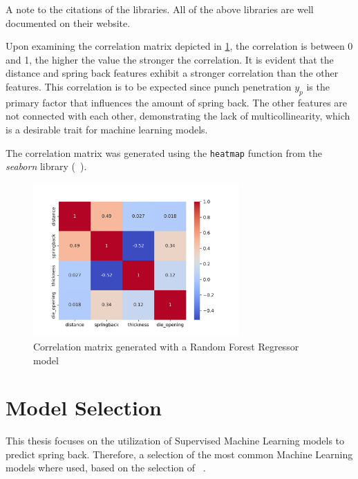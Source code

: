 A note to the citations of the libraries.
All of the above libraries are well documented on their website.

Upon examining the correlation matrix depicted in \cref{fig:correlation_matrix}, the correlation is between 0 and 1,
the higher the value the stronger the correlation.
It is evident that the distance and spring back features exhibit a stronger correlation
than the other features.
This correlation is to be expected since punch penetration $y_p$ is the primary factor
that influences the amount of spring back.
The other features are not connected with each other, demonstrating the lack of multicollinearity, which is a
desirable trait for machine learning models.

The correlation matrix was generated using the \texttt{heatmap} function from the \textit{seaborn} library
(~\cite{Waskom2021}).

\begin{figure}[H]
    \begin{tcolorbox}[arc=0pt,boxrule=0.5pt]
        \centering
        \includegraphics[width=0.7\textwidth]{chap4/images/correlation_matrix}
    \end{tcolorbox}
    \caption{Correlation matrix generated with a Random Forest Regressor model}
    \label{fig:correlation_matrix}
\end{figure}


\section{Model Selection}\label{sec:model-selection}
This thesis focuses on the utilization of Supervised Machine Learning models to predict
spring back.
Therefore, a selection of the most common Machine Learning models where used, based on
the selection of ~\cite{muller2016introduction}.

